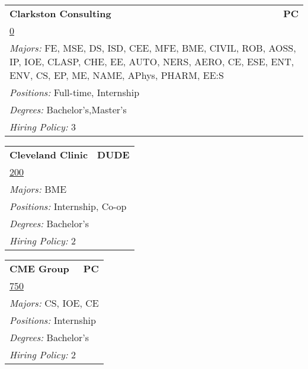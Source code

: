 \documentclass[twoside]{article}
\begin{document}
\begin{center}
\begin{multicols}{3}
\begin{FlushLeft}
\begin{minipage}{.9\columnwidth}\begin{tabularx}{.95\columnwidth}{Xr}
                 {\Large\bf Clarkston Consulting} & {\Large\bf PC}\\
    \multicolumn{2}{p{.95\columnwidth}}{\url{0}}\\
    \multicolumn{2}{p{.95\columnwidth}}{\emph{Majors:} FE, MSE, DS, ISD, CEE, MFE, BME, CIVIL, ROB, AOSS, IP, IOE, CLASP, CHE, EE, AUTO, NERS, AERO, CE, ESE, ENT, ENV, CS, EP, ME, NAME, APhys, PHARM, EE:S}\\
    \multicolumn{2}{p{.95\columnwidth}}{\emph{Positions:} Full-time, Internship}\\
    \multicolumn{2}{p{.95\columnwidth}}{\emph{Degrees:} Bachelor's,Master's}\\
    \multicolumn{2}{p{.95\columnwidth}}{\emph{Hiring Policy:} 3}\\
    \end{tabularx}
    
\end{minipage}
 
\begin{minipage}{.9\columnwidth}\begin{tabularx}{.95\columnwidth}{Xr}
                 {\Large\bf Cleveland Clinic} & {\Large\bf DUDE}\\
    \multicolumn{2}{p{.95\columnwidth}}{\url{200}}\\
    \multicolumn{2}{p{.95\columnwidth}}{\emph{Majors:} BME}\\
    \multicolumn{2}{p{.95\columnwidth}}{\emph{Positions:} Internship, Co-op}\\
    \multicolumn{2}{p{.95\columnwidth}}{\emph{Degrees:} Bachelor's}\\
    \multicolumn{2}{p{.95\columnwidth}}{\emph{Hiring Policy:} 2}\\
    \end{tabularx}
    
\end{minipage}
 
\begin{minipage}{.9\columnwidth}\begin{tabularx}{.95\columnwidth}{Xr}
                 {\Large\bf CME Group} & {\Large\bf PC}\\
    \multicolumn{2}{p{.95\columnwidth}}{\url{750}}\\
    \multicolumn{2}{p{.95\columnwidth}}{\emph{Majors:} CS, IOE, CE}\\
    \multicolumn{2}{p{.95\columnwidth}}{\emph{Positions:} Internship}\\
    \multicolumn{2}{p{.95\columnwidth}}{\emph{Degrees:} Bachelor's}\\
    \multicolumn{2}{p{.95\columnwidth}}{\emph{Hiring Policy:} 2}\\
    \end{tabularx}
    

\end{minipage}
\end{FlushLeft}
\end{multicols}
\end{center}
\end{document}
